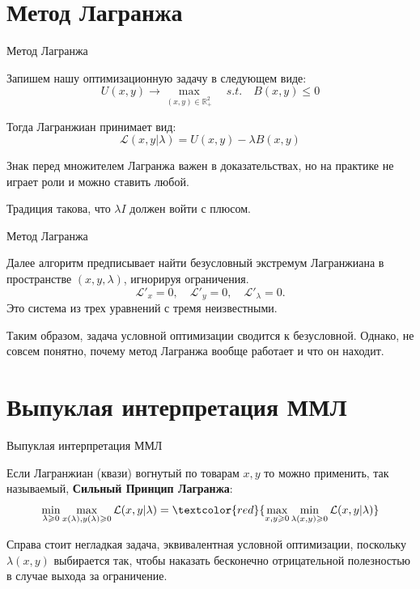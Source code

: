\documentclass{beamer}
\begin{document}
\section{Метод Лагранжа}

\begin{frame}{Метод Лагранжа}

Запишем нашу оптимизационную задачу в следующем виде:
$$ U(x, y) \to \max_{(x,y) \in \mathbb{R}^2_{+}} \quad s.t.\quad  B(x,y) \leqslant 0$$

Тогда Лагранжиан принимает вид:
$$ \mathcal{L}(x, y | \lambda) = U(x,y) - \lambda B(x,y)$$

Знак перед множителем Лагранжа важен в доказательствах, но на практике  не играет роли и можно ставить любой.

Традиция такова, что $\lambda I$ должен войти с плюсом.

\end{frame}

\begin{frame}{Метод Лагранжа}

Далее алгоритм предписывает найти безусловный экстремум Лагранжиана в пространстве $(x, y, \lambda)$, игнорируя ограничения.
$$ \mathcal{L}'_x = 0, \quad \mathcal{L}'_y = 0, \quad \mathcal{L}'_{\lambda} = 0.$$
Это система из трех уравнений с тремя неизвестными.

Таким образом, задача условной оптимизации сводится к безусловной. Однако, не совсем понятно, почему метод Лагранжа вообще работает и что он находит.

\end{frame}

\section{Выпуклая интерпретация ММЛ}

\begin{frame}{Выпуклая интерпретация ММЛ}

Если Лагранжиан (квази) вогнутый по товарам $x,y$ то можно применить, так называемый, \textbf{Сильный Принцип Лагранжа}:
$$ \min_{\lambda \geqslant 0} \max_{x(\lambda),y(\lambda) \geqslant 0} \mathcal{L}(x,y | \lambda) = \textcolor{red}{\max_{x,y \geqslant 0} \min_{\lambda(x,y) \geqslant 0} \mathcal{L}(x,y | \lambda)} $$ 

Справа стоит негладкая задача, эквивалентная условной оптимизации, поскольку $\lambda(x,y)$ выбирается так, чтобы наказать бесконечно отрицательной полезностью в случае выхода за ограничение.

\end{frame}
\end{document}
